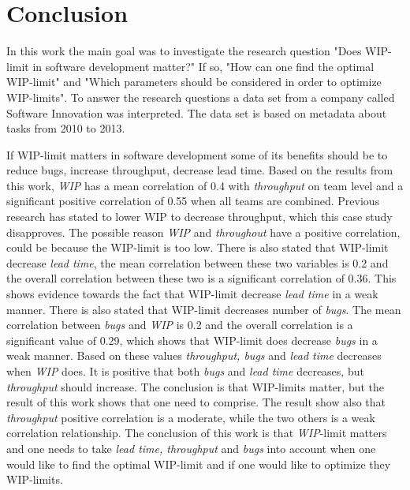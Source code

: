 \documentclass[UKenglish]{ifimaster}  %
\begin{document}
\chapter{Conclusion}
\label{ch:conc}
In this work the main goal was to investigate the research question "Does WIP-limit in software development matter?" If so, "How can one find the optimal WIP-limit" and "Which parameters should be considered in order to optimize WIP-limits".  To answer the research questions a data set from a company called Software Innovation was interpreted. The data set is based on metadata about tasks from 2010 to 2013.



If WIP-limit matters in software development some of its benefits should be to reduce bugs, increase throughput, decrease lead time. Based on the results from this work, \textit{WIP} has a mean correlation of 0.4 with \textit{throughput} on team level and a significant positive correlation of 0.55 when all teams are combined. Previous research has stated to lower WIP to decrease throughput, which this case study disapproves. The possible reason \textit{WIP} and \textit{throughout} have a positive correlation, could be because the  WIP-limit is too low. There is also stated that WIP-limit decrease \textit{lead time}, the mean correlation between these two variables is 0.2 and the overall correlation between these two is a significant correlation of 0.36. This shows evidence towards the fact that WIP-limit decrease \textit{lead time} in a weak manner. There is also stated that WIP-limit decreases number of \textit{bugs}. The mean correlation between \textit{bugs} and \textit{WIP} is 0.2 and the overall correlation is a significant value of 0.29, which shows that WIP-limit does decrease \textit{bugs} in a weak manner.  Based on these values \textit{throughput, bugs} and \textit{lead time} decreases when \textit{WIP} does. It is positive that both \textit{bugs} and \textit{lead time} decreases, but \textit{throughput} should increase.  The conclusion is that WIP-limits matter, but the result of this work shows that one need to comprise. The result show also that \textit{throughput} positive correlation is a moderate, while the two others is a weak correlation relationship. The conclusion of this work is that \textit{WIP}-limit matters and one needs to take \textit{lead time, throughput} and \textit{bugs} into account when one would like to find the optimal WIP-limit and if one would like to optimize they WIP-limits.

\end{document}
